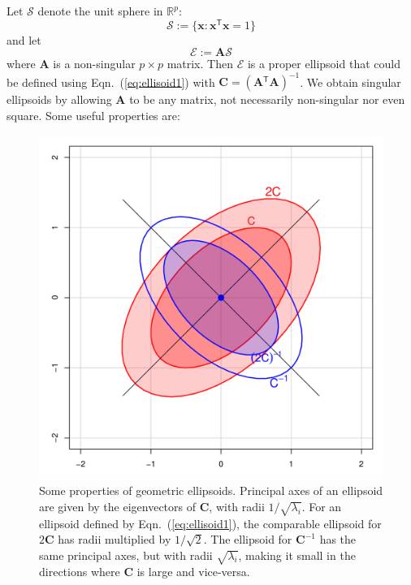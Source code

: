 \documentclass[11pt]{article}%
\renewcommand*{\eqref}[1]{Eqn.~(\ref{#1})}
\renewcommand*{\vec}[1]{\ensuremath{\bm{#1}}}
\newcommand{\trans}{\ensuremath{^\mathsf{T}}}
\newcommand*{\mat}[1]{\ensuremath{\bm{#1}}}
\newcommand*{\Real}[1]{\mathbb{R}^{#1}}
\begin{document}
Let $\mathcal{S}$ denote the unit sphere in  $\Real{p}$:
\begin{equation}
\mathcal{S} := \{ \vec{x}: \vec{x}\trans\vec{x} =1 \}
\end{equation}
and let 
\begin{equation}\label{eq:ellisoidsph}
\mathcal{E} := \mat{A} \mathcal{S}
\end{equation}
where $\mat{A}$ is a non-singular $p \times p$ matrix. Then $\mathcal{E}$ is a proper ellipsoid that could be defined using \eqref{eq:ellisoid1} with $\mat{C} = \left( \mat{A} \trans \mat{A} \right)^{-1}$.
We obtain singular ellipsoids by allowing $\mat{A}$ to be any matrix, not necessarily non-singular nor even square. 
Some useful properties are:
\begin{figure}[tb]
  \centering
  \includegraphics[width=.5\textwidth,clip]{fig/inverse}
  \caption{Some properties of geometric ellipsoids. Principal axes of an ellipsoid are given by the eigenvectors of
  $\mat{C}$, with radii $1/\sqrt{\lambda_i}$.  For an ellipsoid defined by \eqref{eq:ellisoid1},
  the comparable ellipsoid for $2\mat{C}$ has radii multiplied by $1/\sqrt{2}$.
  The ellipsoid for $\mat{C}^{-1}$ has the same principal axes, but with radii $\sqrt{\lambda_i}$, making it
  small in the directions where $\mat{C}$ is large and vice-versa.
  } \label{fig:inverse}
\end{figure}
\end{document}
